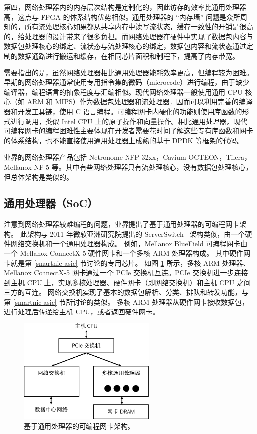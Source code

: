 第四，网络处理器内的内存层次结构是定制化的，因此访存的效率比通用处理器高，这点与 FPGA 的体系结构优势相似。通用处理器的 ``内存墙'' 问题是众所周知的，所有流处理核心如果都从共享内存中读写流状态，缓存一致性的开销是很高的，给处理器的设计带来了很多负担。而网络处理器在硬件中实现了数据包内容与数据包处理核心的绑定、流状态与流处理核心的绑定，数据包内容和流状态通过定制的数据通路进行搬运和缓存，在相同芯片面积和制程下，提高了内存带宽。

需要指出的是，虽然网络处理器相比通用处理器能耗效率更高，但编程较为困难。早期的网络处理器通常使用专用指令集的微码（microcode）进行编程，由于缺少编译器，编程语言的抽象程度与汇编相似。现代网络处理器一般使用通用 CPU 核心（如 ARM 和 MIPS）作为数据包处理器和流处理器，因而可以利用完善的编译器和开发工具链，使用 C 语言编程。可编程网卡内硬化的功能则使用库函数的形式进行调用，类似 Intel CPU 上的原子操作和向量操作。相比通用处理器，现代可编程网卡的编程困难性主要体现在开发者需要花时间了解这些专有库函数和网卡的体系结构，也不能直接使用通用处理器上成熟的基于 DPDK 等框架的代码。

业界的网络处理器产品包括 Netronome NFP-32xx，Cavium OCTEON，Tilera，Mellanox NP-5 等。其中有些网络处理器只有流处理核心，没有数据包处理核心，但总体架构是类似的。




\subsection{通用处理器（SoC）}
\label{smartnic-soc}

注意到网络处理器较难编程的问题，业界提出了基于通用处理器的可编程网卡架构。
此架构与 2011 年微软亚洲研究院提出的 ServerSwitch~\cite{lu2011serverswitch} 架构类似，由一个硬件网络交换机和一个通用处理器构成。
例如，Mellanox BlueField 可编程网卡由一个 Mellanox ConnectX-5 硬件网卡和一个多核 ARM 处理器构成。
其中硬件网卡就是第 \ref{smartnic-asic} 节讨论的专用芯片。
如图 \ref{background:fig:smartnic_soc} 所示，多核 ARM 处理器、Mellanox ConnectX-5 网卡通过一个 PCIe 交换机互连。PCIe 交换机进一步连接到主机 CPU 上，实现多核处理器、硬件网卡（即网络交换机）和主机 CPU 之间三方的互连。
网络交换机实现了基本的数据包解析、分类、排队和转发功能，与第 \ref{smartnic-asic} 节所讨论的类似。
多核 ARM 处理器从硬件网卡接收数据包，进行处理后传递给主机 CPU，或者返回硬件网卡。


\begin{figure}[htbp]
	\centering
	\includegraphics[width=0.6\textwidth]{figures/smartnic_soc.pdf}
	\caption{基于通用处理器的可编程网卡架构。}
	\label{background:fig:smartnic_soc}
\end{figure}

